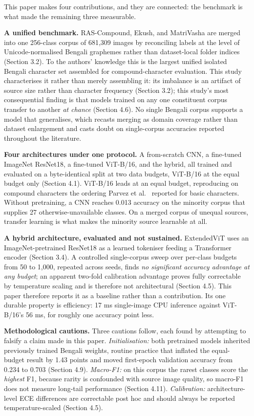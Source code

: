 This paper makes four contributions, and they are connected: the
benchmark is what made the remaining three measurable.

\textbf{A unified benchmark.} RAS-Compound, Ekush, and MatriVasha are merged into one 256-class corpus of 681,309 images by reconciling
labels at the level of Unicode-normalised Bengali graphemes rather than
dataset-local folder indices (Section 3.2). To the authors' knowledge this is the
largest unified isolated Bengali character set assembled for
compound-character evaluation. This study characterises it rather than merely
assembling it: its imbalance is an artifact of source size rather than
character frequency (Section 3.2); this study's most consequential finding is that models trained on any one constituent corpus transfer to
another \emph{at chance} (Section 4.6). No single Bengali corpus
supports a model that generalises, which recasts merging as domain
coverage rather than dataset enlargement and casts doubt on
single-corpus accuracies reported throughout the literature.

\textbf{Four architectures under one protocol.} A from-scratch CNN, a
fine-tuned ImageNet ResNet18, a fine-tuned ViT-B/16, and the hybrid, all
trained and evaluated on a byte-identical split at two data budgets, ViT-B/16 at the equal budget only
(Section 4.1). ViT-B/16 leads at an equal budget, reproducing on compound
characters the ordering Parvez et al.~\citeyearpar{ref17} reported for basic
characters. Without pretraining, a CNN reaches 0.013 accuracy on the
minority corpus that supplies 27 otherwise-unavailable classes. On a
merged corpus of unequal sources, transfer learning is what makes the
minority source learnable at all.

\textbf{A hybrid architecture, evaluated and not sustained.} ExtendedViT uses an ImageNet-pretrained ResNet18 as a learned tokeniser feeding a Transformer encoder (Section 3.4). A controlled
single-corpus sweep over per-class budgets from 50 to 1,000, repeated
across seeds, finds \emph{no significant accuracy advantage at any
budget}; an apparent two-fold calibration advantage proves fully
correctable by temperature scaling and is therefore not architectural
(Section 4.5). This paper therefore reports it as a baseline rather than a contribution.
Its one durable property is efficiency: 17 ms single-image CPU inference
against ViT-B/16's 56 ms, for roughly one accuracy point less.

\textbf{Methodological cautions.} Three cautions follow, each found by attempting to falsify a claim made in this paper. \emph{Initialisation:} both pretrained models inherited previously trained Bengali weights, routine practice
that inflated the equal-budget result by 1.43 points and moved
first-epoch validation accuracy from 0.234 to 0.703 (Section 4.9).
\emph{Macro-F1:} on this corpus the rarest classes score the
\emph{highest} F1, because rarity is confounded with source image
quality, so macro-F1 does not measure long-tail performance (Section
4.11). \emph{Calibration:} architecture-level ECE differences are
correctable post hoc and should always be reported temperature-scaled
(Section 4.5).


